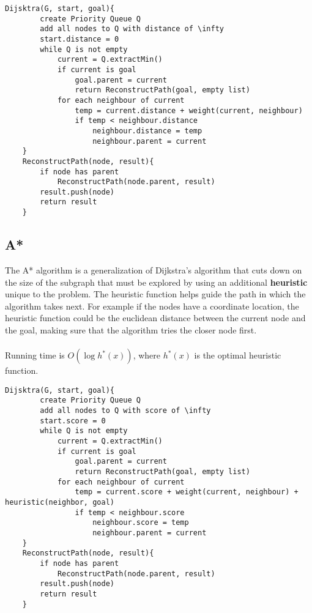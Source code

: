 \documentclass{article}
\begin{document}
	\begin{lstlisting}[style=pseudo]
	Dijsktra(G, start, goal){
		create Priority Queue Q
		add all nodes to Q with distance of \infty
		start.distance = 0
		while Q is not empty
			current = Q.extractMin()
			if current is goal
				goal.parent = current
				return ReconstructPath(goal, empty list)
			for each neighbour of current
				temp = current.distance + weight(current, neighbour)
				if temp < neighbour.distance
					neighbour.distance = temp
					neighbour.parent = current
	}
	ReconstructPath(node, result){
		if node has parent
			ReconstructPath(node.parent, result)
		result.push(node)
		return result
	}
	\end{lstlisting}



	\subsection{A*}
	The A* algorithm is a generalization of Dijkstra's algorithm that cuts down on the size of the subgraph that must be explored by using an additional {\bf heuristic} unique to the problem. The heuristic function helps guide the path in which the algorithm takes next. For example if the nodes have a coordinate location, the heuristic function could be the euclidean distance between the current node and the goal, making sure that the algorithm tries the closer node first.
	\\ \\
	Running time is $O(\log h^{*}(x))$, where $h^{*}(x)$ is the optimal heuristic function.

	\begin{lstlisting}[style=pseudo]
	Dijsktra(G, start, goal){
		create Priority Queue Q
		add all nodes to Q with score of \infty
		start.score = 0
		while Q is not empty
			current = Q.extractMin()
			if current is goal
				goal.parent = current
				return ReconstructPath(goal, empty list)
			for each neighbour of current
				temp = current.score + weight(current, neighbour) + heuristic(neighbor, goal)
				if temp < neighbour.score
					neighbour.score = temp
					neighbour.parent = current
	}
	ReconstructPath(node, result){
		if node has parent
			ReconstructPath(node.parent, result)
		result.push(node)
		return result
	}
	\end{lstlisting}


\end{document}
